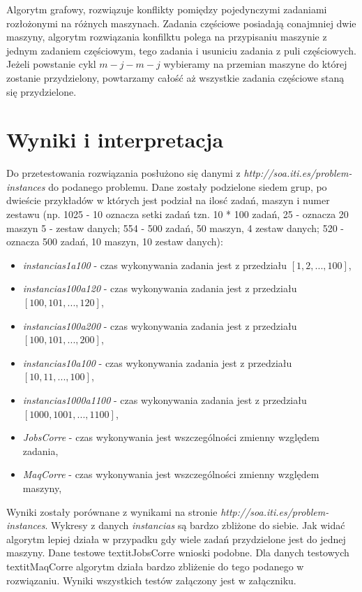 Algorytm grafowy, rozwiązuje konflikty pomiędzy pojedynczymi zadaniami rozłożonymi na różnych maszynach.
Zadania częściowe posiadają conajmniej dwie maszyny, algorytm rozwiązania konfilktu polega na 
przypisaniu maszynie z jednym zadaniem częściowym, tego zadania i usuniciu zadania z puli częściowych.
Jeżeli powstanie cykl $m-j-m-j$ wybieramy na przemian maszyne do której zostanie przydzielony, 
powtarzamy całość aż wszystkie zadania częściowe staną się przydzielone. 

\section{Wyniki i interpretacja}

Do przetestowania rozwiązania posłużono się danymi z \textit{http://soa.iti.es/problem-instances} do podanego problemu.
Dane zostały podzielone siedem grup, po dwieście przykładów w których jest podział na ilosć
zadań, maszyn i numer zestawu (np. 1025 - 10 oznacza setki zadań tzn. 10 * 100 zadań, 25 - oznacza 20 maszyn 5 - 
 zestaw danych; 554 - 500 zadań, 50 maszyn, 4 zestaw danych; 520 - oznacza 500 zadań, 10 maszyn, 10 zestaw danych):
\begin{itemize}
    \item \textit{instancias1a100} - czas wykonywania zadania jest z przedziału $[1,2,...,100]$,
    \item \textit{instancias100a120} - czas wykonywania zadania jest z przedziału $[100,101,...,120]$,
    \item \textit{instancias100a200} - czas wykonywania zadania jest z przedziału $[100,101,...,200]$,
    \item \textit{instancias10a100} - czas wykonywania zadania jest z przedziału $[10,11,...,100]$,
    \item \textit{instancias1000a1100} - czas wykonywania zadania jest z przedziału $[1000,1001,...,1100]$,
    \item \textit{JobsCorre} - czas wykonywania jest wszczególności zmienny względem zadania,
    \item \textit{MaqCorre} - czas wykonywania jest wszczególności zmienny względem maszyny,
\end{itemize}
Wyniki zostały porównane z wynikami na stronie \textit{http://soa.iti.es/problem-instances}.
Wykresy z danych \textit{instancias} są bardzo zbliżone do siebie. Jak widać algorytm lepiej działa w przypadku
gdy wiele zadań przydzielone jest do jednej maszyny. Dane testowe textit{JobsCorre} wnioski podobne.
Dla danych testowych textit{MaqCorre} algorytm działa bardzo zbliżenie do tego podanego w rozwiązaniu. 
Wyniki wszystkich testów załączony jest w załączniku. 


